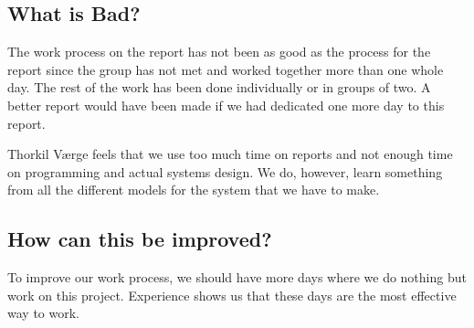 \documentclass[11pt,a4paper]{report}
\begin{document}
\subsection{What is Bad?}
The work process on the  report has not been as good as the process for the  report since the group has not met and worked together more than one whole day. The rest of the work has been done individually or in groups of two. A better report would have been made if we had dedicated one more day to this report.

Thorkil Værge feels that we use too much time on reports and not enough time on programming and actual systems design. We do, however, learn something from all the different models for the system that we have to make.

\subsection{How can this be improved?}
To improve our work process, we should have more days where we do nothing but work on this project. Experience shows us that these days are the most effective way to work.
\end{document}
